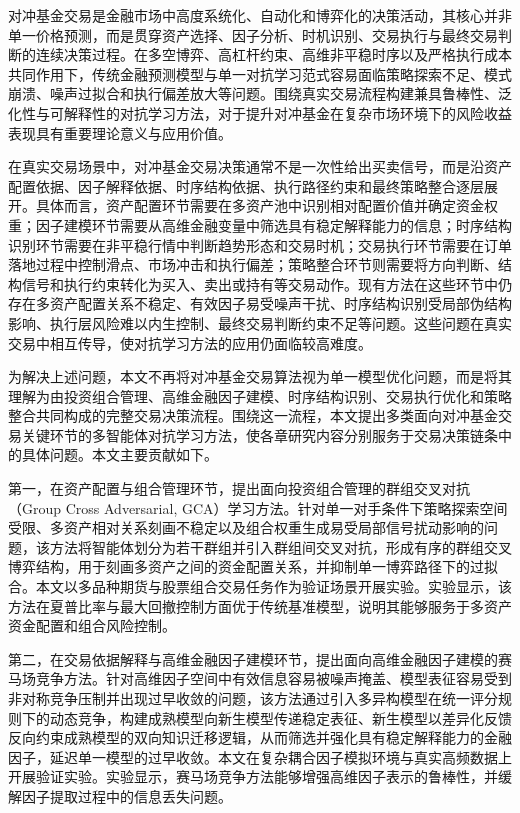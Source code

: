 \begin{cabstract}
对冲基金交易是金融市场中高度系统化、自动化和博弈化的决策活动，其核心并非单一价格预测，而是贯穿资产选择、因子分析、时机识别、交易执行与最终交易判断的连续决策过程。在多空博弈、高杠杆约束、高维非平稳时序以及严格执行成本共同作用下，传统金融预测模型与单一对抗学习范式容易面临策略探索不足、模式崩溃、噪声过拟合和执行偏差放大等问题。围绕真实交易流程构建兼具鲁棒性、泛化性与可解释性的对抗学习方法，对于提升对冲基金在复杂市场环境下的风险收益表现具有重要理论意义与应用价值。

在真实交易场景中，对冲基金交易决策通常不是一次性给出买卖信号，而是沿资产配置依据、因子解释依据、时序结构依据、执行路径约束和最终策略整合逐层展开。具体而言，资产配置环节需要在多资产池中识别相对配置价值并确定资金权重；因子建模环节需要从高维金融变量中筛选具有稳定解释能力的信息；时序结构识别环节需要在非平稳行情中判断趋势形态和交易时机；交易执行环节需要在订单落地过程中控制滑点、市场冲击和执行偏差；策略整合环节则需要将方向判断、结构信号和执行约束转化为买入、卖出或持有等交易动作。现有方法在这些环节中仍存在多资产配置关系不稳定、有效因子易受噪声干扰、时序结构识别受局部伪结构影响、执行层风险难以内生控制、最终交易判断约束不足等问题。这些问题在真实交易中相互传导，使对抗学习方法的应用仍面临较高难度。

为解决上述问题，本文不再将对冲基金交易算法视为单一模型优化问题，而是将其理解为由投资组合管理、高维金融因子建模、时序结构识别、交易执行优化和策略整合共同构成的完整交易决策流程。围绕这一流程，本文提出多类面向对冲基金交易关键环节的多智能体对抗学习方法，使各章研究内容分别服务于交易决策链条中的具体问题。本文主要贡献如下。

第一，在资产配置与组合管理环节，提出面向投资组合管理的群组交叉对抗（Group Cross Adversarial, GCA）学习方法。针对单一对手条件下策略探索空间受限、多资产相对关系刻画不稳定以及组合权重生成易受局部信号扰动影响的问题，该方法将智能体划分为若干群组并引入群组间交叉对抗，形成有序的群组交叉博弈结构，用于刻画多资产之间的资金配置关系，并抑制单一博弈路径下的过拟合。本文以多品种期货与股票组合交易任务作为验证场景开展实验。实验显示，该方法在夏普比率与最大回撤控制方面优于传统基准模型，说明其能够服务于多资产资金配置和组合风险控制。

第二，在交易依据解释与高维金融因子建模环节，提出面向高维金融因子建模的赛马场竞争方法。针对高维因子空间中有效信息容易被噪声掩盖、模型表征容易受到非对称竞争压制并出现过早收敛的问题，该方法通过引入多异构模型在统一评分规则下的动态竞争，构建成熟模型向新生模型传递稳定表征、新生模型以差异化反馈反向约束成熟模型的双向知识迁移逻辑，从而筛选并强化具有稳定解释能力的金融因子，延迟单一模型的过早收敛。本文在复杂耦合因子模拟环境与真实高频数据上开展验证实验。实验显示，赛马场竞争方法能够增强高维因子表示的鲁棒性，并缓解因子提取过程中的信息丢失问题。


\end{cabstract}
